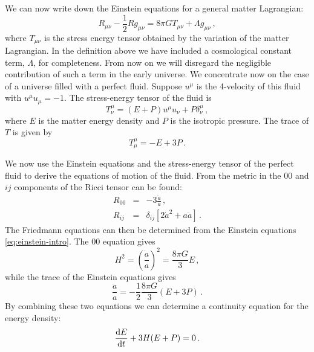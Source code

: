 We can now write down the Einstein equations for a general matter Lagrangian:
% 
\begin{equation}
\label{eq:einstein-intro}
 R_{\mu\nu} - \frac{1}{2}R g_{\mu\nu} = 8\pi G T_{\mu\nu} + \Lambda
g_{\mu\nu}\,,
\end{equation}
% 
where $T_{\mu\nu}$ is the stress energy tensor obtained by the variation of the
matter Lagrangian. 
In the definition above we have included a
cosmological constant term, $\Lambda$, for completeness. From now on we will
disregard the negligible contribution of such a term in the early universe.
We concentrate now on the case of a universe filled with a perfect
fluid. Suppose $u^\mu$ is the 4-velocity of this fluid with $u^\mu
u_\mu=-1$. The stress-energy tensor of the fluid is
% 
\begin{equation}
 \label{eq:fluidstress-intro}
  T^\mu_\nu = (E + P)u^\mu u_\nu + P\delta^\mu_\nu \,,
\end{equation}
% 
where $E$ is the matter energy density and $P$ is the isotropic pressure.
The trace of $T$ is given by
% 
\begin{equation}
 \label{eq:Ttrace-intro}
  T^\mu_\mu = -E + 3P\,.
\end{equation}
% 

We now use the Einstein equations and the stress-energy tensor of the
perfect fluid to derive the equations of motion of the fluid.
From the metric in  the $00$ and $ij$ components of the
Ricci tensor can be found:
% 
\begin{eqnarray}
\label{eq:Ricci00-intro}
 R_{00} &=& -3 \frac{\ddot{a}}{a} \,,\\
\label{eq:Ricciij-intro}
 R_{ij} &=& \delta_{ij} \left[ 2\dot{a}^2 +
  a \ddot{a} \right] \,.
\end{eqnarray}
% 
The Friedmann equations can then be determined from the Einstein equations
\eqref{eq:einstein-intro}.
The $00$ equation gives
% 
\begin{equation}
 \label{eq:Friedmann1-intro}
 H^2 = \left(\frac{\dot{a}}{a}\right)^2 = \frac{8\pi G}{3} E \,,
\end{equation}
% 
while the trace of the Einstein equations gives
% 
\begin{equation}
 \label{eq:Friedmann2-intro}
 \frac{\ddot{a}}{a}  = -\frac{1}{2} \frac{8\pi G}{3}(E + 3P)\,.
\end{equation}
% 
By combining these two equations we can determine a continuity equation for the
energy density:
\begin{equation}
 \label{eq:continuity-intro}
 \frac{\mathrm{d} E}{\mathrm{d} t} + 3H(E+P) = 0 \,.
\end{equation}




